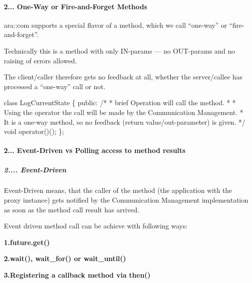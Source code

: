 \paragraph*{2... One-\/\+Way or Fire-\/and-\/\+Forget Methods}


\begin{DoxyItemize}
\item ara\+::com supports a special flavor of a method, which we call “one-\/way” or “fire-\/and-\/forget”.
\item Technically this is a method with only I\+N-\/params — no O\+U\+T-\/params and no raising of errors allowed.
\item The client/caller therefore gets no feedback at all, whether the server/callee has processed a “one-\/way” call or not.
\end{DoxyItemize}


\begin{DoxyCode}
\textcolor{keyword}{class }LogCurrentState \{
  \textcolor{keyword}{public}:
  \textcolor{comment}{/*}
\textcolor{comment}{  * brief Operation will call the method.}
\textcolor{comment}{  *}
\textcolor{comment}{  * Using the operator the call will be made by the Communication Management.}
\textcolor{comment}{  * It is a one-way method, so no feedback (return value/out-parameter) is given.}
\textcolor{comment}{  */}
  \textcolor{keywordtype}{void} operator()();
\};
\end{DoxyCode}
 \paragraph*{2... Event-\/\+Driven vs Polling access to method results}

\subparagraph*{2.... Event-\/\+Driven}


\begin{DoxyItemize}
\item Event-\/\+Driven means, that the caller of the method (the application with the proxy instance) gets notified by the Communication Management implementation as soon as the method call result has arrived.
\item Event driven method call can be achieve with following ways\+:
\begin{DoxyItemize}
\item {\bfseries 1.\+future.\+get()}
\item {\bfseries 2.\+wait(), wait\+\_\+for() or wait\+\_\+until()}
\item {\bfseries 3.\+Registering a callback method via then()}
\end{DoxyItemize}
\end{DoxyItemize}

